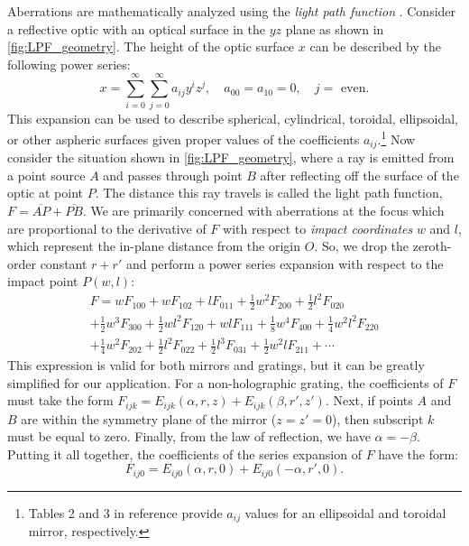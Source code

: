 Aberrations are mathematically analyzed using the \textit{light path function} \cite{nodaGeometricTheoryGrating1974,howellsMirrorsSynchrotronRadiationBeamlines1994,polettoMicrofocusingAttosecondPulses2013}. Consider a reflective optic with an optical surface in the $yz$ plane as shown in \cref{fig:LPF_geometry}. The height of the optic surface $x$ can be described by the following power series:
\begin{equation}
x = \sum_{i=0}^{\infty} \sum_{j=0}^{\infty} a_{ij} y^i z^j, \quad a_{00} = a_{10} = 0, \quad j = \textrm{ even}.
\label{eqn:mirror_power_series}
\end{equation}
This expansion can be used to describe spherical, cylindrical, toroidal, ellipsoidal, or other aspheric surfaces given proper values of the coefficients $a_{ij}$.\footnote{Tables 2 and 3 in reference \cite{howellsMirrorsSynchrotronRadiationBeamlines1994} provide $a_{ij}$ values for an ellipsoidal and toroidal mirror, respectively.} Now consider the situation shown in \cref{fig:LPF_geometry}, where a ray is emitted from a point source $A$ and passes through point $B$ after reflecting off the surface of the optic at point $P$. The distance this ray travels is called the light path function, $F = \overline{AP} + \overline{PB}$. 
We are primarily concerned with aberrations at the focus which are proportional to the derivative of $F$ with respect to \textit{impact coordinates} $w$ and $l$, which represent the in-plane distance from the origin $O$. So, we drop the zeroth-order constant $r + r'$ and perform a power series expansion with respect to the impact point $P(w,l)$:
\begin{multline}
F = w F_{100} + w F_{102} + l F_{011} + \frac{1}{2} w^2 F_{200}+ \frac{1}{2} l^2 F_{020} \\
+ \frac{1}{2} w^3 F_{300} + \frac{1}{2} w l^2 F_{120} + w l F_{111} + \frac{1}{8} w^4 F_{400} + \frac{1}{4} w^2 l^2 F_{220} \\
+ \frac{1}{4} w^2 F_{202} + \frac{1}{2} l^2 F_{022} + \frac{1}{2} l^3 F_{031} + \frac{1}{2} w^2 l F_{211} + \cdots
\label{eqn:LPF_Fijk}
\end{multline}
This expression is valid for both mirrors and gratings, but it can be greatly simplified for our application. For a non-holographic grating, the coefficients of $F$ must take the form $F_{ijk} = E_{ijk}(\alpha, r, z) + E_{ijk}(\beta, r', z')$. Next, if points $A$ and $B$ are within the symmetry plane of the mirror ($z=z'=0$), then subscript $k$ must be equal to zero. Finally, from the law of reflection, we have $\alpha = -\beta$. Putting it all together, the coefficients of the series expansion of $F$ have the form:
\begin{equation}
F_{ij0} = E_{ij0}(\alpha, r, 0) + E_{ij0}(-\alpha, r', 0).
\end{equation}

